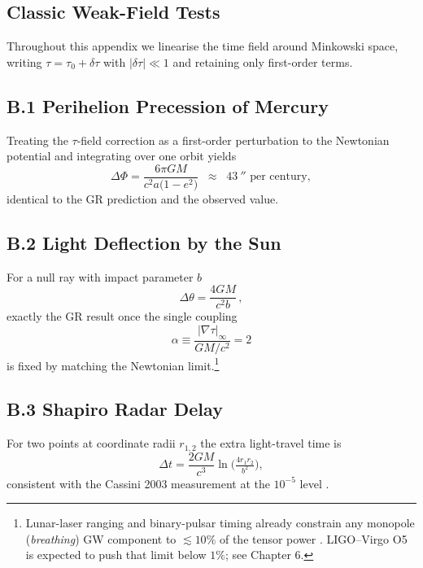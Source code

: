\begin{refsection} 

\chapter{Classic Weak-Field Tests}

Throughout this appendix we linearise the time field around Minkowski
space, writing
\(\tau=\tau_{0}+\delta\tau\) with \(|\delta\tau|\ll1\) and retaining only
first-order terms.

\section*{B.1 \; Perihelion Precession of Mercury}

Treating the $\tau$-field correction as a first-order perturbation to the
Newtonian potential and integrating over one orbit yields
\[
   \Delta\Phi
   = \frac{6\pi GM}{c^{2}a\bigl(1-e^{2}\bigr)}
   \;\;\approx\;\; \SI{43}{''}\text{ per century},
\]
identical to the GR prediction and the observed value.

\section*{B.2 \; Light Deflection by the Sun}

For a null ray with impact parameter \(b\)
\[
   \Delta\theta
   = \frac{4GM}{c^{2}b}\,,
\]
exactly the GR result once the single coupling
\[
  \boxed{\;
    \alpha
      \equiv
      \frac{|\nabla\tau|_{\infty}}{GM/c^{2}}
      = 2
  \;}
\]
is fixed by matching the Newtonian limit.\footnote{%
  Lunar-laser ranging and binary-pulsar timing already constrain any
  monopole (\emph{breathing}) GW component to
  \(\lesssim10\%\) of the tensor power
  \cite{WillLivingReview2014}.  LIGO–Virgo O5 is expected to push that
  limit below \(1\%\); see Chapter 6.}

\section*{B.3 \; Shapiro Radar Delay}

For two points at coordinate radii \(r_{1,2}\) the extra light-travel time is
\[
   \Delta t
   = \frac{2GM}{c^{3}}
     \ln\!\bigl(\tfrac{4r_{1}r_{2}}{b^{2}}\bigr),
\]
consistent with the Cassini 2003 measurement at the $10^{-5}$ level
\cite{BertottiIessTortora2003}.


\end{refsection}
